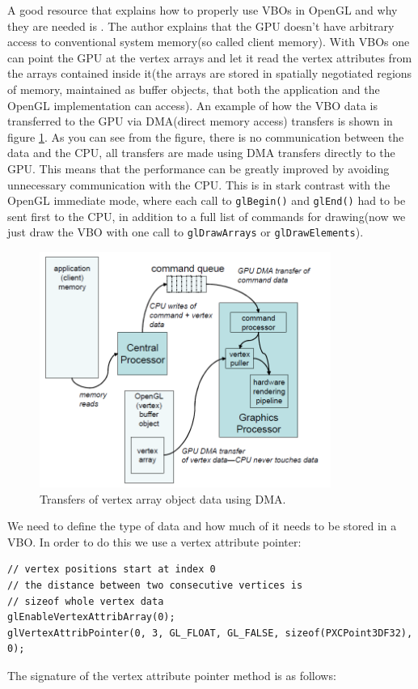 \documentclass[]{article}
\begin{document}
A good resource that explains how to properly use VBOs in OpenGL and why they are needed is \cite{kilgard2009}. The author explains that the GPU doesn't have arbitrary access to conventional system memory(so called client memory). With VBOs one can point the GPU at the vertex arrays and let it read the vertex attributes from the arrays contained inside it(the arrays are stored in spatially negotiated regions of memory, maintained as buffer objects, that both the application and the OpenGL implementation can access). An example of how the VBO data is transferred to the GPU via DMA(direct memory access) transfers is shown in figure \ref{fig:VBOClientMemory}. As you can see from the figure, there is no communication between the data and the CPU, all transfers are made using DMA transfers directly to the GPU. This means that the performance can be greatly improved by avoiding unnecessary communication with the CPU. This is in stark contrast with the OpenGL immediate mode, where each call to \verb|glBegin()| and \verb|glEnd()| had to be sent first to the CPU, in addition to a full list of commands for drawing(now we just draw the VBO with one call to \verb|glDrawArrays| or \verb|glDrawElements|).
\begin{figure}[hbtp]
    \centering
    \includegraphics[width=0.85\textwidth]{figures/VBOClientMemory.PNG}
    \caption{Transfers of vertex array object data using DMA.}
    \label{fig:VBOClientMemory}
\end{figure}

We need to define the type of data and how much of it needs to be stored in a VBO. In order to do this we use a vertex attribute pointer:
\begin{verbatim}
// vertex positions start at index 0
// the distance between two consecutive vertices is
// sizeof whole vertex data
glEnableVertexAttribArray(0);
glVertexAttribPointer(0, 3, GL_FLOAT, GL_FALSE, sizeof(PXCPoint3DF32), 0);
\end{verbatim}
The signature of the vertex attribute pointer method is as follows:
\end{document}

